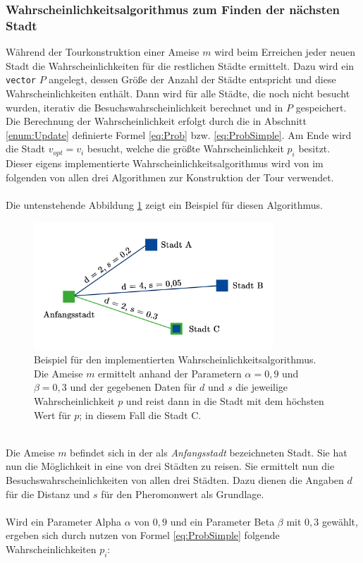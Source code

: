 \documentclass[doktyp=barbeit, sprache=german]{TUBAFarbeiten}
\begin{document}
\subsubsection{Wahrscheinlichkeitsalgorithmus zum Finden der nächsten Stadt}
Während der Tourkonstruktion einer Ameise $m$ wird beim Erreichen jeder neuen Stadt die Wahrscheinlichkeiten für die restlichen Städte ermittelt. 
Dazu wird ein \texttt{vector} $P$ angelegt, dessen Größe der Anzahl der Städte entspricht und diese Wahrscheinlichkeiten enthält. Dann wird für alle Städte, die noch nicht besucht wurden, iterativ die Besuchswahrscheinlichkeit berechnet und in $P$ gespeichert. Die Berechnung der Wahrscheinlichkeit erfolgt durch die in Abschnitt \ref{enum:Update} definierte Formel \ref{eq:Prob} bzw. \ref{eq:ProbSimple}. Am Ende wird die Stadt $v_{opt} = v_i$ besucht, welche die größte Wahrscheinlichkeit $p_i$ besitzt. \\Dieser eigens implementierte Wahrscheinlichkeitsalgorithmus wird von im folgenden von allen drei Algorithmen zur Konstruktion der Tour verwendet.
\\\\Die untenstehende Abbildung \ref{img:probimage} zeigt ein Beispiel für diesen Algorithmus. 
\begin{figure}
\captionsetup{justification=centering}
  \centering
     \includegraphics[width=0.8\textwidth]{images/probimage.png}
  \caption{Beispiel für den implementierten Wahrscheinlichkeitsalgorithmus. Die Ameise $m$ ermittelt anhand der Parametern $\alpha = 0,9$ und $\beta = 0,3$ und der gegebenen Daten für $d$ und $s$ die jeweilige Wahrscheinlichkeit $p$ und reist dann in die Stadt mit dem höchsten Wert für $p$; in diesem Fall die Stadt C.}
  \label{img:probimage}
\end{figure}
\\Die Ameise $m$ befindet sich in der als \textit{Anfangsstadt} bezeichneten Stadt. Sie hat nun die Möglichkeit in eine von drei Städten zu reisen. Sie ermittelt nun die Besuchswahrscheinlichkeiten von allen drei Städten. Dazu dienen die Angaben $d$ für die Distanz und $s$ für den Pheromonwert als Grundlage. \\\\Wird ein Parameter Alpha $\alpha$ von $0,9$ und ein Parameter Beta $\beta$ mit $0,3$ gewählt, ergeben sich durch nutzen von Formel \ref{eq:ProbSimple} folgende Wahrscheinlichkeiten $p_i$:
\end{document}
